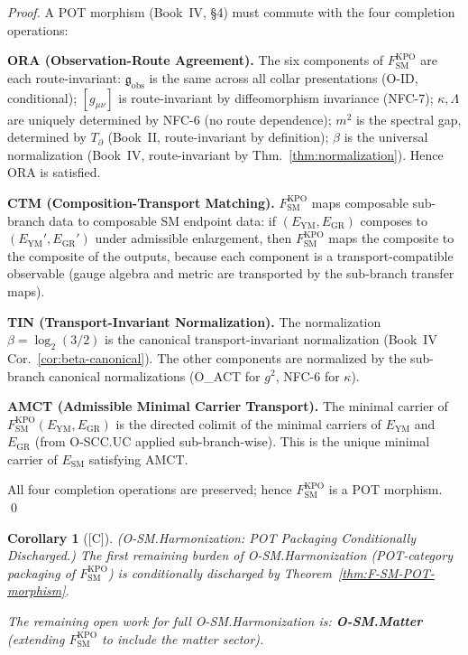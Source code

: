 \documentclass[12pt,oneside]{amsbook}
\theoremstyle{plain}
\newtheorem{corollary}[theorem]{Corollary}
\theoremstyle{definition}
\theoremstyle{remark}
\newcommand{\status}[1]{\textup{[#1]}}
\begin{document}
\begin{proof}
A POT morphism (Book~IV, §4) must commute with the four completion
operations:

\textbf{ORA (Observation-Route Agreement).}
The six components of $F_{\mathrm{SM}}^{\mathrm{KPO}}$ are each
route-invariant: $\mathfrak{g}_{\mathrm{obs}}$ is the same across
all collar presentations (O-ID, conditional); $[g_{\mu\nu}]$ is
route-invariant by diffeomorphism invariance (NFC-7);
$\kappa, \Lambda$ are uniquely determined by NFC-6 (no route
dependence); $m^2$ is the spectral gap, determined by $T_\partial$
(Book~II, route-invariant by definition); $\beta$ is the universal
normalization (Book~IV, route-invariant by
Thm.~\ref{thm:normalization}). Hence ORA is satisfied.

\textbf{CTM (Composition-Transport Matching).}
$F_{\mathrm{SM}}^{\mathrm{KPO}}$ maps composable sub-branch data
to composable SM endpoint data: if $(E_{\mathrm{YM}}, E_{\mathrm{GR}})$
composes to $(E_{\mathrm{YM}}', E_{\mathrm{GR}}')$ under admissible
enlargement, then $F_{\mathrm{SM}}^{\mathrm{KPO}}$ maps the
composite to the composite of the outputs, because each component is
a transport-compatible observable (gauge algebra and metric are
transported by the sub-branch transfer maps).

\textbf{TIN (Transport-Invariant Normalization).}
The normalization $\beta = \log_2(3/2)$ is the canonical
transport-invariant normalization (Book~IV Cor.~\ref{cor:beta-canonical}).
The other components are normalized by the sub-branch canonical
normalizations (O\_ACT for $g^2$, NFC-6 for $\kappa$).

\textbf{AMCT (Admissible Minimal Carrier Transport).}
The minimal carrier of $F_{\mathrm{SM}}^{\mathrm{KPO}}(E_{\mathrm{YM}},
E_{\mathrm{GR}})$ is the directed colimit of the minimal carriers of
$E_{\mathrm{YM}}$ and $E_{\mathrm{GR}}$ (from O-SCC.UC applied
sub-branch-wise). This is the unique minimal carrier of $E_{\mathrm{SM}}$
satisfying AMCT.

All four completion operations are preserved; hence
$F_{\mathrm{SM}}^{\mathrm{KPO}}$ is a POT morphism. \qed
\end{proof}

\begin{corollary}[\status{C}]\label{cor:SM-harmonization-POT}
\textup{(O-SM.Harmonization: POT Packaging Conditionally Discharged.)}
The first remaining burden of O-SM.Harmonization (POT-category
packaging of $F_{\mathrm{SM}}^{\mathrm{KPO}}$) is conditionally
discharged by Theorem~\ref{thm:F-SM-POT-morphism}.

The remaining open work for full O-SM.Harmonization is:
\textbf{O-SM.Matter} (extending $F_{\mathrm{SM}}^{\mathrm{KPO}}$ to
include the matter sector).
\end{corollary}
\end{document}

